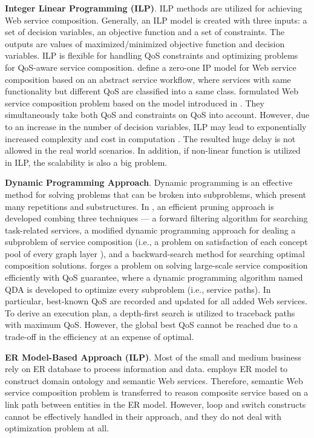 \textbf{Integer Linear Programming (ILP)}. ILP methods are utilized for achieving Web service composition. Generally, an ILP model is created with three inputs: a set of decision variables, an objective function and a set of constraints. The outputs are values of maximized/minimized objective function and decision variables. ILP is flexible for handling QoS  constraints and optimizing problems for QoS-aware service composition. \cite{gao2005Web} define a zero-one IP model for Web service composition based on an abstract service workflow, where services with same functionality but different QoS are classified into a same class. \cite{yoo2008Web} formulated Web service composition problem based on the model introduced in \cite{gao2005Web}. They simultaneously take both QoS and constraints on QoS into account. However, due to an increase in the number of decision variables, ILP may lead to exponentially increased complexity and cost in computation \cite{li2016full}. The resulted huge delay is not allowed in the real world scenarios. In addition, if non-linear function is utilized in ILP, the scalability is also a big problem.
 
\textbf{Dynamic Programming Approach}. Dynamic programming is an effective method for solving problems that can be broken into subproblems, which present many repetitions and substructures. In  \cite{huang2009effective}, an efficient pruning approach is developed combing three techniques --- a forward filtering algorithm for searching task-related services, a modified dynamic programming approach for dealing a subproblem of service composition (i.e., a problem on satisfaction of each concept pool of every graph layer ), and a backward-search method for searching optimal composition solutions. \cite{xu2012towards} forges a problem on solving large-scale service composition efficiently with QoS guarantee, where a dynamic programming algorithm named QDA is developed to optimize every subproblem (i.e., service paths). In particular, best-known QoS are recorded and updated for all added Web services. To derive an execution plan, a depth-first search is utilized to traceback paths with maximum QoS. However, the global best QoS cannot be reached due to a trade-off in the efficiency at an expense of optimal.

\textbf{ER Model-Based Approach (ILP)}. Most of the small and medium business rely on ER database to process information and data. \cite{xu2010semantic} employs ER model to construct domain ontology and semantic Web services. Therefore, semantic Web service composition problem is transferred to reason composite service based on a link path between entities in the ER model. However, loop and switch constructs cannot be effectively handled in their approach, and they do not deal with optimization problem at all.

